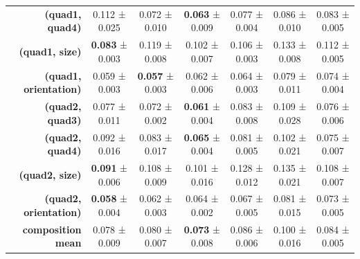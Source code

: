 \begin{tabular}{rcccccc}
\textbf{(quad1, quad4)} & 0.112 ± 0.025 & 0.072 ± 0.010 & \textbf{0.063} ± 0.009 & 0.077 ± 0.004 & 0.086 ± 0.010 & 0.083 ± 0.005 \\
\textbf{(quad1, size)} & \textbf{0.083} ± 0.003 & 0.119 ± 0.008 & 0.102 ± 0.007 & 0.106 ± 0.003 & 0.133 ± 0.008 & 0.112 ± 0.005 \\
\textbf{(quad1, orientation)} & 0.059 ± 0.003 & \textbf{0.057} ± 0.003 & 0.062 ± 0.006 & 0.064 ± 0.003 & 0.079 ± 0.011 & 0.074 ± 0.004 \\
\textbf{(quad2, quad3)} & 0.077 ± 0.011 & 0.072 ± 0.002 & \textbf{0.061} ± 0.004 & 0.083 ± 0.008 & 0.109 ± 0.028 & 0.076 ± 0.006 \\
\textbf{(quad2, quad4)} & 0.092 ± 0.016 & 0.083 ± 0.017 & \textbf{0.065} ± 0.004 & 0.081 ± 0.005 & 0.102 ± 0.021 & 0.075 ± 0.007 \\
\textbf{(quad2, size)} & \textbf{0.091} ± 0.006 & 0.108 ± 0.009 & 0.101 ± 0.016 & 0.128 ± 0.012 & 0.135 ± 0.021 & 0.108 ± 0.007 \\
\textbf{(quad2, orientation)} & \textbf{0.058} ± 0.004 & 0.062 ± 0.003 & 0.064 ± 0.002 & 0.067 ± 0.005 & 0.081 ± 0.015 & 0.073 ± 0.005 \\
\addlinespace
\textbf{composition mean} & 0.078 ± 0.009 & 0.080 ± 0.007 & \textbf{0.073} ± 0.008 & 0.086 ± 0.006 & 0.100 ± 0.016 & 0.084 ± 0.005 \\
\midrule
\bottomrule
\end{tabular}